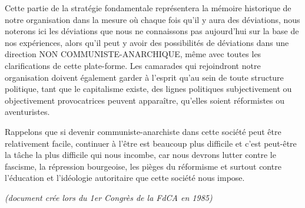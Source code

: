 Cette partie de la stratégie fondamentale représentera la mémoire historique de notre organisation dans la mesure où chaque fois qu'il y aura des déviations, nous noterons ici les déviations que nous ne connaissons pas aujourd'hui sur la base de nos expériences, alors qu'il peut y avoir des possibilités de déviations dans une direction NON COMMUNISTE-ANARCHIQUE, même avec toutes les clarifications de cette plate-forme. Les camarades qui rejoindront notre organisation doivent également garder à l'esprit qu'au sein de toute structure politique, tant que le capitalisme existe, des lignes politiques subjectivement ou objectivement provocatrices peuvent apparaître, qu'elles soient réformistes ou aventuristes.

Rappelons que si devenir communiste-anarchiste dans cette société peut être relativement facile, continuer à l'être est beaucoup plus difficile et c'est peut-être la tâche la plus difficile qui nous incombe, car nous devrons lutter contre le fascisme, la répression bourgeoise, les pièges du réformisme et surtout contre l'éducation et l'idéologie autoritaire que cette société nous impose.

\emph{(document crée lors du 1er Congrès de la FdCA en 1985)}

